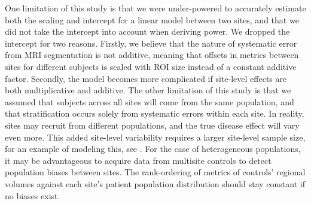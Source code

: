 One limitation of this study is that we were under-powered to accurately estimate both the scaling and intercept for a linear model between two sites, and that we did not take the intercept into account when deriving power. We dropped the intercept for two reasons. Firstly, we believe that the nature of systematic error from MRI segmentation is not additive, meaning that offsets in metrics between sites for different subjects is scaled with ROI size instead of a constant additive factor. Secondly, the model becomes more complicated if site-level effects are both multiplicative and additive. The other limitation of this study is that we assumed that subjects across all sites will come from the same population, and that stratification occurs solely from systematic errors within each site. In reality, sites may recruit from different populations, and the true disease effect will vary even more. This added site-level variability requires a larger site-level sample size, for an example of modeling this, see \cite{enigmarandom}. For the case of heterogeneous populations, it may be advantageous to acquire data from multisite controls to detect population biases between sites. The rank-ordering of metrics of controls' regional volumes against each site's patient population distribution should stay constant if no biases exist.